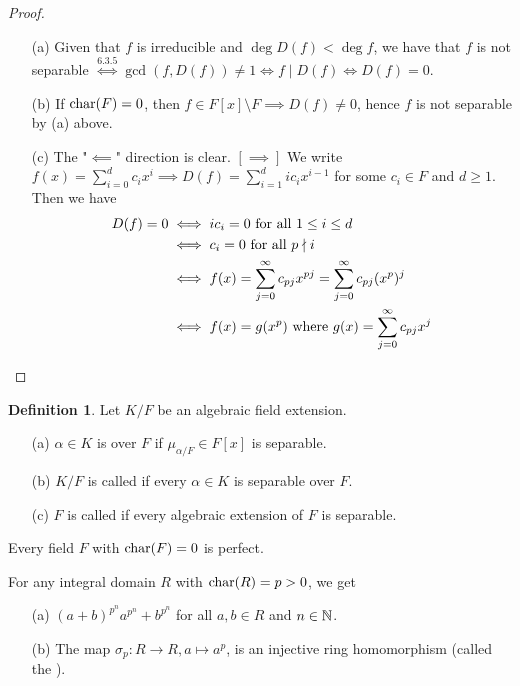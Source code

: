 \documentclass[11pt]{book}
\theoremstyle{definition}   \newtheorem{defn}[counter]{Definition} %
\newcommand{\bs}{\setminus}   \newcommand{\A}{\mathcal{A}}   \newcommand{\sy}{\textnormal{Syl}}   \newcommand{\size}[1]{\left| #1 \right|}
\DeclareMathOperator{\ra}{\rightarrow}   \DeclareMathOperator{\Poly}{\mathbf{P}}   \DeclareMathOperator{\spn}{\textnormal{span}}   \DeclareMathOperator{\aut}{\textnormal{Aut}}
\newcommand{\vs}{\vspace{8pt}}   \newcommand{\hs}{\hspace{8pt}}
\numberwithin{counter}{chapter}
\begin{document}
\begin{proof}\ 
\begin{enumerate}
\item[(a)] Given that $f$ is irreducible and $\deg D(f) < \deg f$, we have that $f$ is not separable $\overset{6.3.5}{\iff} \gcd(f,D(f)) \ne 1 \iff f \mid D(f) \iff D(f) = 0$. 
\item[(b)] If $\textnormal{char}(F) = 0$, then $f \in F[x] \bs F \implies D(f) \ne 0$, hence $f$ is not separable by (a) above. 
\item[(c)] The "$\impliedby$" direction is clear. $[\implies]$ We write $f(x) = \sum_{i=0}^d c_i x^i \implies D(f) = \sum_{i=1}^d i c_i x^{i-1}$ for some $c_i \in F$ and $d \geq 1$. Then we have 
\begin{align*}
D(f) = 0 & \iff ic_i = 0 \textnormal{ for all } 1 \leq i \leq d \\
&\iff c_i = 0 \textnormal{ for all } p \nmid i \\
&\iff f(x) = \sum_{j=0}^\infty c_{pj} x^{pj} = \sum_{j=0}^\infty c_{pj} (x^p)^j \\
&\iff f(x) = g(x^p) \textnormal{ where } g(x) = \sum_{j=0}^\infty c_{pj} x^j
\end{align*}
\end{enumerate}
\end{proof}


\begin{defn}
Let $K/F$ be an algebraic field extension. 
\begin{enumerate}
\item[(a)] $\alpha \in K$ is  over $F$ if $\mu_{\alpha/F} \in F[x]$ is separable. 
\item[(b)] $K/F$ is called \tb{separable} if every $\alpha \in K$ is separable over $F$. 
\item[(c)] $F$ is called \tb{perfect} if every algebraic extension of $F$ is separable. 
\end{enumerate}
\end{defn}

\vs

\begin{corollary}
Every field $F$ with $\textnormal{char}(F) = 0$ is perfect. 
\end{corollary}

\vs

\begin{lemma}[+ Definition]
For any integral domain $R$ with $\textnormal{char}(R) = p > 0$, we get
\begin{enumerate}
\item[(a)] $(a+b)^{p^n}  a^{p^n} + b^{p^n}$ for all $a,b \in R$ and $n \in \operatorname{\mathbb{N}}$. 
\item[(b)] The map $\sigma_p : R \ra R, a \mapsto a^p$, is an injective ring homomorphism (called the ). 
\end{enumerate}
\end{lemma}
\end{document}
